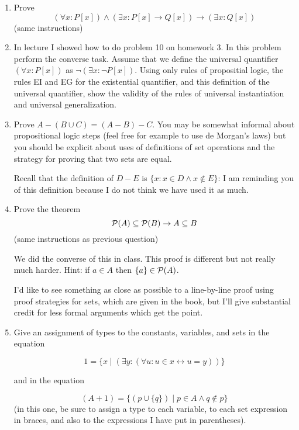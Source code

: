 \documentclass[12pt]{article}
\begin{document}
\begin{enumerate}
\newpage

\item Prove $$(\forall x:P[x]) \wedge (\exists x:P[x] \rightarrow Q[x]) \rightarrow (\exists x:Q[x])$$  (same instructions)

\newpage

\item  In lecture I showed how to do problem 10 on homework 3.  In this problem perform the converse task.  Assume that we define the universal quantifier
$(\forall x:P[x])$ as $\neg (\exists x:\neg P[x])$.  Using only rules of propositial logic, the rules EI and EG for the existential quantifier, and this definition of the universal quantifier,
show the validity of the rules of universal instantiation and universal generalization.

\newpage

\item  Prove $A-(B \cup C) = (A-B)-C$.  You may be somewhat informal about propositional logic steps (feel free for example to use de Morgan's laws) but you should be explicit about uses of definitions of set operations and the strategy for proving that two sets are equal.

Recall that the definition of $D-E$ is $\{x:x \in D \wedge x \not\in E\}$:  I am reminding you of this definition because I do not think we have used it as much.

\newpage

\item  Prove the theorem $${\cal P}(A) \subseteq {\cal P}(B) \rightarrow A \subseteq B$$  (same instructions as previous question)

We did the converse of this in class.  This proof is different but not really much harder.  Hint:  if $a \in A$ then $\{a\} \in {\cal P}(A)$.

I'd like to see something as close as possible to a line-by-line proof using proof strategies for sets, which are given in the book, but I'll give substantial credit for less formal arguments which get the point.

\newpage

\item  Give an assignment of types to the constants, variables, and sets in the equation

$$1 = \{x\mid  (\exists y:(\forall u:u \in x \leftrightarrow u=y))\}$$

and in the equation

$$(A+1) = \{(p \cup \{q\})\mid p \in A \wedge q \not\in p\}$$  (in this one, be sure to assign a type to each variable, to each set expression in braces, and also to the expressions I have put in parentheses).


\end{enumerate}
\end{document}
